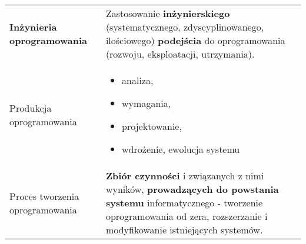 \documentclass[../main.tex]{subfiles}
\begin{document}
    \begin{table}[H]
        \begin{center}
            \begin{tabular}{  p{6cm} p{10cm}  }
                \textbf{Inżynieria oprogramowania}
                &
                Zastosowanie \textbf{inżynierskiego} (systematycznego, zdyscyplinowanego, ilościowego) \textbf{podejścia}
                do oprogramowania (rozwoju, eksploatacji, utrzymania).
                \\
                \cmidrule(r){1-1}\cmidrule(l){2-2}
                Produkcja oprogramowania
                &
                \begin{itemize}
                    \item analiza,
                    \item wymagania,
                    \item projektowanie,
                    \item wdrożenie, ewolucja systemu
                \end{itemize}
                \\
                \cmidrule(r){1-1}\cmidrule(l){2-2}
                Proces tworzenia oprogramowania
                &
                \textbf{Zbiór czynności} i związanych z nimi wyników, \textbf{prowadzących do powstania
                systemu} informatycznego - tworzenie oprogramowania od zera, rozszerzanie i modyfikowanie istniejących systemów.
                \\

                \cmidrule(r){1-1}\cmidrule(l){2-2}


\end{tabular}
\end{center}
\end{table}
\end{document}
